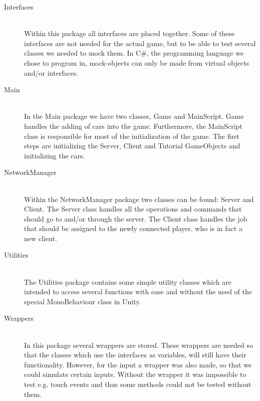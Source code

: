 \documentclass[11pt,twoside,a4paper]{article}
\begin{document}
\begin{description}
\item[Interfaces] \hfill \\
    Within this package all interfaces are placed together. Some of these interfaces are not needed for the actual game, but to be able to test several classes we needed to mock them. In C\#, the programming language we chose to program in, mock-objects can only be made from virtual objects and/or interfaces. 
\item[Main] \hfill \\
    In the Main package we have two classes, Game and MainScript. Game handles the adding of cars into the game. Furthermore, the MainScript class is responsible for most of the initialization of the game. The first steps are initializing the Server, Client and Tutorial GameObjects and initializing the cars.
\item[NetworkManager] \hfill \\
    Within the NetworkManager package two classes can be found: Server and Client. The Server class handles all the operations and commands that should go to and/or through the server. The Client class handles the job that should be assigned to the newly connected player, who is in fact a new client.
\item[Utilities] \hfill \\
    The Utilities package contains some simple utility classes which are intended to access several functions with ease and without the need of the special MonoBehaviour class in Unity.
    \newpage
\item[Wrappers] \hfill \\
    In this package several wrappers are stored. These wrappers are needed so that the classes which use the interfaces as variables, will still have their functionality. However, for the input a wrapper was also made, so that we could simulate certain inputs. Without the wrapper it was impossible to test e.g. touch events and thus some methods could not be tested without them.
    
\end{description}
\end{document}
